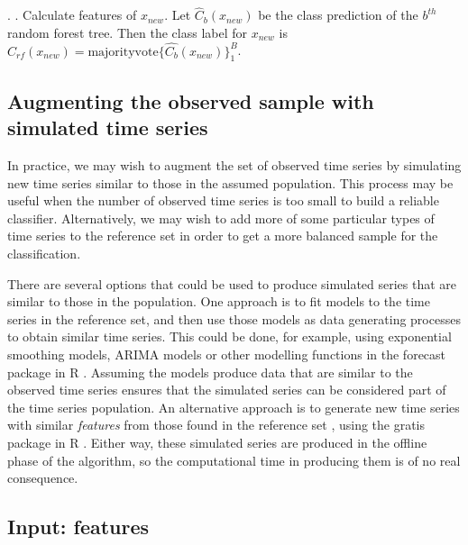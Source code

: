 \documentclass[11pt,a4paper,]{article}
\begin{document}
\begin{algorithm}[!ht]
\begin{algorithmic}[1]
        \Statex \hspace{1cm}.
        \Statex {}
        \Statex \hspace{1cm}.
        \State Calculate features of $x_{\textit{new}}$.
        \State Let $\hat{C}_b(x_{\textit{new}})$ be the class prediction of the $b^{th}$ random forest tree. Then the class label for $x_{\textit{new}}$ is $\hat{C}_{rf}(x_{\textit{new}})=\text{majorityvote}\{\hat{C_b}(x_{\textit{new}})\}_1^B$.
    \end{algorithmic}
\end{algorithm}

\hypertarget{simulatingseries}{%
\subsection{Augmenting the observed sample with simulated time series}\label{simulatingseries}}

In practice, we may wish to augment the set of observed time series by simulating new time series similar to those in the assumed population. This process may be useful when the number of observed time series is too small to build a reliable classifier. Alternatively, we may wish to add more of some particular types of time series to the reference set in order to get a more balanced sample for the classification.

There are several options that could be used to produce simulated series that are similar to those in the population. One approach is to fit models to the time series in the reference set, and then use those models as data generating processes to obtain similar time series. This could be done, for example, using exponential smoothing models, ARIMA models or other modelling functions in the forecast package in R \autocite{forecast}. Assuming the models produce data that are similar to the observed time series ensures that the simulated series can be considered part of the time series population. An alternative approach is to generate new time series with similar \emph{features} from those found in the reference set \autocite{kang2020gratis}, using the gratis package in R \autocite{Rgratis}. Either way, these simulated series are produced in the offline phase of the algorithm, so the computational time in producing them is of no real consequence.

\hypertarget{input-features}{%
\subsection{Input: features}\label{input-features}}
\end{document}
